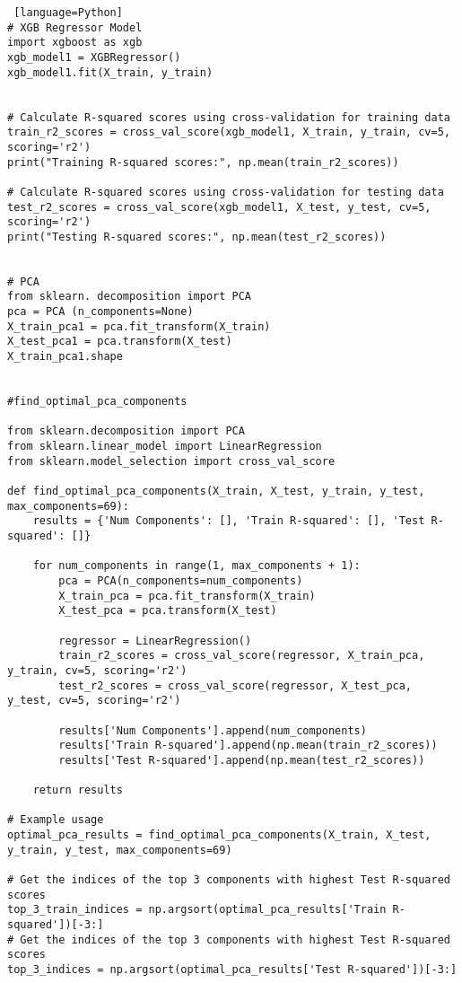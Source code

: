 \documentclass[12pt, a4paper,oneside]{book}
\numberwithin{equation}{section}
\begin{document}
\begin{lstlisting} [language=Python]
# XGB Regressor Model
import xgboost as xgb
xgb_model1 = XGBRegressor()
xgb_model1.fit(X_train, y_train)


# Calculate R-squared scores using cross-validation for training data
train_r2_scores = cross_val_score(xgb_model1, X_train, y_train, cv=5, scoring='r2')
print("Training R-squared scores:", np.mean(train_r2_scores))

# Calculate R-squared scores using cross-validation for testing data
test_r2_scores = cross_val_score(xgb_model1, X_test, y_test, cv=5, scoring='r2')
print("Testing R-squared scores:", np.mean(test_r2_scores))


# PCA
from sklearn. decomposition import PCA
pca = PCA (n_components=None)
X_train_pca1 = pca.fit_transform(X_train)
X_test_pca1 = pca.transform(X_test)
X_train_pca1.shape


#find_optimal_pca_components

from sklearn.decomposition import PCA
from sklearn.linear_model import LinearRegression
from sklearn.model_selection import cross_val_score

def find_optimal_pca_components(X_train, X_test, y_train, y_test, max_components=69):
    results = {'Num Components': [], 'Train R-squared': [], 'Test R-squared': []}

    for num_components in range(1, max_components + 1):
        pca = PCA(n_components=num_components)
        X_train_pca = pca.fit_transform(X_train)
        X_test_pca = pca.transform(X_test)

        regressor = LinearRegression()
        train_r2_scores = cross_val_score(regressor, X_train_pca, y_train, cv=5, scoring='r2')
        test_r2_scores = cross_val_score(regressor, X_test_pca, y_test, cv=5, scoring='r2')

        results['Num Components'].append(num_components)
        results['Train R-squared'].append(np.mean(train_r2_scores))
        results['Test R-squared'].append(np.mean(test_r2_scores))

    return results

# Example usage
optimal_pca_results = find_optimal_pca_components(X_train, X_test, y_train, y_test, max_components=69)

# Get the indices of the top 3 components with highest Test R-squared scores
top_3_train_indices = np.argsort(optimal_pca_results['Train R-squared'])[-3:]
# Get the indices of the top 3 components with highest Test R-squared scores
top_3_indices = np.argsort(optimal_pca_results['Test R-squared'])[-3:]


\end{lstlisting}
\end{document}
